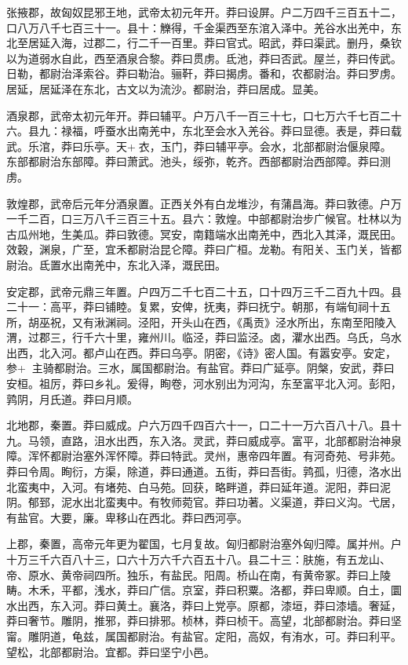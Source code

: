 \documentclass[12pt,UTF8]{ctexbook}
\begin{document}
张掖郡，故匈奴昆邪王地，武帝太初元年开。莽曰设屏。户二万四千三百五十二，口八万八千七百三十一。县十：觻得，千金渠西至东涫入泽中。羌谷水出羌中，东北至居延入海，过郡二，行二千一百里。莽曰官式。昭武，莽曰渠武。删丹，桑钦以为道弱水自此，西至酒泉合黎。莽曰贯虏。氐池，莽曰否武。屋兰，莽曰传武。日勒，都尉治泽索谷。莽曰勒治。骊靬，莽曰揭虏。番和，农都尉治。莽曰罗虏。居延，居延泽在东北，古文以为流沙。都尉治，莽曰居成。显美。



酒泉郡，武帝太初元年开。莽曰辅平。户万八千一百三十七，口七万六千七百二十六。县九：禄福，呼蚕水出南羌中，东北至会水入羌谷。莽曰显德。表是，莽曰载武。乐涫，莽曰乐亭。天+衣，玉门，莽曰辅平亭。会水，北部都尉治偃泉障。东部都尉治东部障。莽曰萧武。池头，绥弥，乾齐。西部都尉治西部障。莽曰测虏。



敦煌郡，武帝后元年分酒泉置。正西关外有白龙堆沙，有蒲昌海。莽曰敦德。户万一千二百，口三万八千三百三十五。县六：敦煌。中部都尉治步广候官。杜林以为古瓜州地，生美瓜。莽曰敦德。冥安，南籍端水出南羌中，西北入其泽，溉民田。效穀，渊泉，广至，宜禾都尉治昆仑障。莽曰广桓。龙勒。有阳关、玉门关，皆都尉治。氐置水出南羌中，东北入泽，溉民田。



安定郡，武帝元鼎三年置。户四万二千七百二十五，口十四万三千二百九十四。县二十一：高平，莽曰铺睦。复累，安俾，抚夷，莽曰抚宁。朝那，有端旬祠十五所，胡巫祝，又有湫渊祠。泾阳，开头山在西，《禹贡》泾水所出，东南至阳陵入渭，过郡三，行千六十里，雍州川。临泾，莽曰监泾。卤，灈水出西。乌氏，乌水出西，北入河。都卢山在西。莽曰乌亭。阴密，《诗》密人国。有嚣安亭。安定，参+，主骑都尉治。三水，属国都尉治。有盐官。莽曰广延亭。阴槃，安武，莽曰安桓。祖厉，莽曰乡礼。爰得，眴卷，河水别出为河沟，东至富平北入河。彭阳，鹑阴，月氏道。莽曰月顺。



北地郡，秦置。莽曰威成。户六万四千四百六十一，口二十一万六百八十八。县十九。马领，直路，沮水出西，东入洛。灵武，莽曰威成亭。富平，北部都尉治神泉障。浑怀都尉治塞外浑怀障。莽曰特武。灵州，惠帝四年置。有河奇苑、号非苑。莽曰令周。眴衍，方渠，除道，莽曰通道。五街，莽曰吾街。鹑孤，归德，洛水出北蛮夷中，入河。有堵苑、白马苑。回获，略畔道，莽曰延年道。泥阳，莽曰泥阴。郁郅，泥水出北蛮夷中。有牧师菀官。莽曰功著。义渠道，莽曰义沟。弋居，有盐官。大要，廉。卑移山在西北。莽曰西河亭。



上郡，秦置，高帝元年更为翟国，七月复故。匈归都尉治塞外匈归障。属并州。户十万三千六百八十三，口六十万六千六百五十八。县二十三：肤施，有五龙山、帝、原水、黄帝祠四所。独乐，有盐民。阳周。桥山在南，有黄帝冢。莽曰上陵畴。木禾，平都，浅水，莽曰广信。京室，莽曰积粟。洛都，莽曰卑顺。白土，圜水出西，东入河。莽曰黄土。襄洛，莽曰上党亭。原都，漆垣，莽曰漆墙。奢延，莽曰奢节。雕阴，推邪，莽曰排邪。桢林，莽曰桢干。高望，北部都尉治。莽曰坚甯。雕阴道，龟兹，属国都尉治。有盐官。定阳，高奴，有洧水，可。莽曰利平。望松，北部都尉治。宜都。莽曰坚宁小邑。
\end{document}
